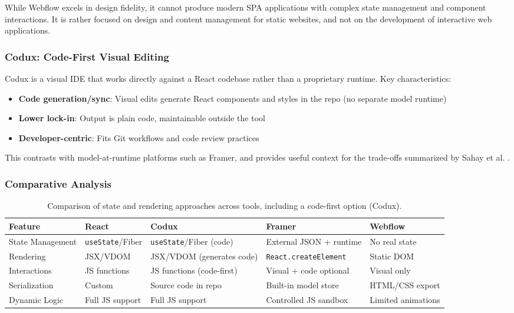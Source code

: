 \documentclass[oneside,12pt]{book}
\begin{document}
While Webflow excels in design fidelity, it cannot produce modern \gls{SPA} applications with complex state management and component interactions. It is rather focused on design and content management for static websites, and not on the development of interactive web applications.

\subsubsection{Codux: Code-First Visual Editing}

Codux is a visual IDE that works directly against a React codebase rather than a proprietary runtime. Key characteristics:

\begin{itemize}
    \item \textbf{Code generation/sync}: Visual edits generate React components and styles in the repo (no separate model runtime)
    \item \textbf{Lower lock-in}: Output is plain code, maintainable outside the tool
    \item \textbf{Developer-centric}: Fits Git workflows and code review practices
\end{itemize}

This contrasts with model-at-runtime platforms such as Framer, and provides useful context for the trade-offs summarized by Sahay et al. \cite{sahay2020supporting}.

\subsubsection{Comparative Analysis}

\begin{table}[ht]
\centering
\small %
\begin{tabular}{@{}lllll@{}}
\toprule
\textbf{Feature} & \textbf{React} & \textbf{Codux} & \textbf{Framer} & \textbf{Webflow} \\
\midrule
State Management & \texttt{useState}/Fiber & \texttt{useState}/Fiber (code) & External JSON + runtime & No real state \\
Rendering & JSX/VDOM & JSX/VDOM (generates code) & \texttt{React.createElement} & Static DOM \\
Interactions & JS functions & JS functions (code-first) & Visual + code optional & Visual only \\
Serialization & Custom & Source code in repo & Built-in model store & HTML/CSS export \\
Dynamic Logic & Full JS support & Full JS support & Controlled JS sandbox & Limited animations \\
\bottomrule
\end{tabular}
\caption{Comparison of state and rendering approaches across tools, including a code-first option (Codux).}
\label{tab:platform-comparison}
\end{table}
\end{document}
